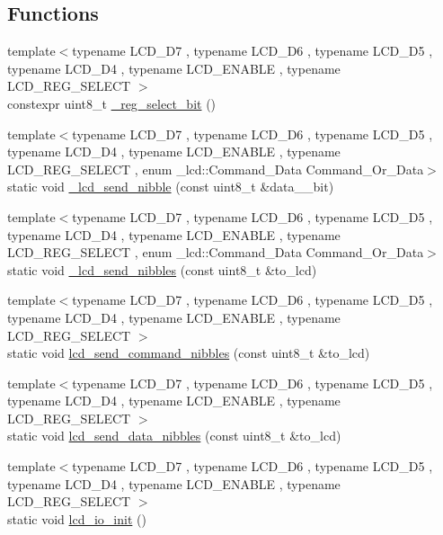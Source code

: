 \subsection*{Functions}
\begin{DoxyCompactItemize}
\item 
{\footnotesize template$<$typename L\+C\+D\+\_\+\+D7 , typename L\+C\+D\+\_\+\+D6 , typename L\+C\+D\+\_\+\+D5 , typename L\+C\+D\+\_\+\+D4 , typename L\+C\+D\+\_\+\+E\+N\+A\+B\+LE , typename L\+C\+D\+\_\+\+R\+E\+G\+\_\+\+S\+E\+L\+E\+CT $>$ }\\constexpr uint8\+\_\+t \hyperlink{namespace__lcd_ac6da9e91093b96ef074c72665e6dc649}{\+\_\+reg\+\_\+select\+\_\+bit} ()
\item 
{\footnotesize template$<$typename L\+C\+D\+\_\+\+D7 , typename L\+C\+D\+\_\+\+D6 , typename L\+C\+D\+\_\+\+D5 , typename L\+C\+D\+\_\+\+D4 , typename L\+C\+D\+\_\+\+E\+N\+A\+B\+LE , typename L\+C\+D\+\_\+\+R\+E\+G\+\_\+\+S\+E\+L\+E\+CT , enum \+\_\+lcd\+::\+Command\+\_\+\+Data Command\+\_\+\+Or\+\_\+\+Data$>$ }\\static void \hyperlink{namespace__lcd_abcab50fa1305ce523c7bc2ecfc10dd4b}{\+\_\+lcd\+\_\+send\+\_\+nibble} (const uint8\+\_\+t \&data\+\_\+\_\+bit)
\item 
{\footnotesize template$<$typename L\+C\+D\+\_\+\+D7 , typename L\+C\+D\+\_\+\+D6 , typename L\+C\+D\+\_\+\+D5 , typename L\+C\+D\+\_\+\+D4 , typename L\+C\+D\+\_\+\+E\+N\+A\+B\+LE , typename L\+C\+D\+\_\+\+R\+E\+G\+\_\+\+S\+E\+L\+E\+CT , enum \+\_\+lcd\+::\+Command\+\_\+\+Data Command\+\_\+\+Or\+\_\+\+Data$>$ }\\static void \hyperlink{namespace__lcd_ac9078fbd15fff6154396f468df3801a9}{\+\_\+lcd\+\_\+send\+\_\+nibbles} (const uint8\+\_\+t \&to\+\_\+lcd)
\item 
{\footnotesize template$<$typename L\+C\+D\+\_\+\+D7 , typename L\+C\+D\+\_\+\+D6 , typename L\+C\+D\+\_\+\+D5 , typename L\+C\+D\+\_\+\+D4 , typename L\+C\+D\+\_\+\+E\+N\+A\+B\+LE , typename L\+C\+D\+\_\+\+R\+E\+G\+\_\+\+S\+E\+L\+E\+CT $>$ }\\static void \hyperlink{namespace__lcd_a19b7494e20f4704c3272876e70acf095}{lcd\+\_\+send\+\_\+command\+\_\+nibbles} (const uint8\+\_\+t \&to\+\_\+lcd)
\item 
{\footnotesize template$<$typename L\+C\+D\+\_\+\+D7 , typename L\+C\+D\+\_\+\+D6 , typename L\+C\+D\+\_\+\+D5 , typename L\+C\+D\+\_\+\+D4 , typename L\+C\+D\+\_\+\+E\+N\+A\+B\+LE , typename L\+C\+D\+\_\+\+R\+E\+G\+\_\+\+S\+E\+L\+E\+CT $>$ }\\static void \hyperlink{namespace__lcd_aee51ff72fcb02d50a39e33820a950a45}{lcd\+\_\+send\+\_\+data\+\_\+nibbles} (const uint8\+\_\+t \&to\+\_\+lcd)
\item 
{\footnotesize template$<$typename L\+C\+D\+\_\+\+D7 , typename L\+C\+D\+\_\+\+D6 , typename L\+C\+D\+\_\+\+D5 , typename L\+C\+D\+\_\+\+D4 , typename L\+C\+D\+\_\+\+E\+N\+A\+B\+LE , typename L\+C\+D\+\_\+\+R\+E\+G\+\_\+\+S\+E\+L\+E\+CT $>$ }\\static void \hyperlink{namespace__lcd_adb3976e2d3fb582565fe36a693df65d1}{lcd\+\_\+io\+\_\+init} ()
\end{DoxyCompactItemize}

